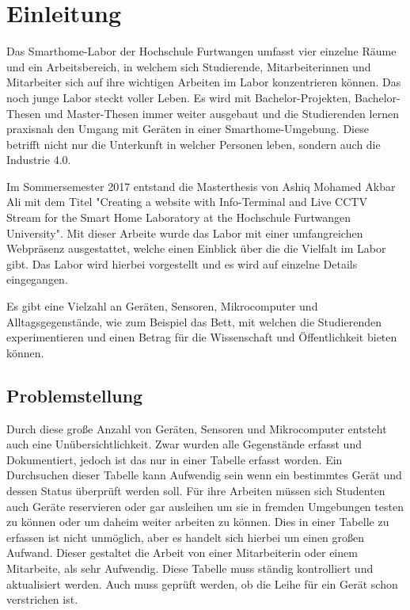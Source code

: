 \chapter{Einleitung}
Das Smarthome-Labor der Hochschule Furtwangen umfasst vier einzelne Räume und ein Arbeitsbereich, in welchem sich Studierende, Mitarbeiterinnen und Mitarbeiter sich auf ihre wichtigen Arbeiten im Labor konzentrieren können. Das noch junge Labor steckt voller Leben. Es wird mit Bachelor-Projekten, Bachelor-Thesen und Master-Thesen immer weiter ausgebaut und die Studierenden lernen praxisnah den Umgang mit Geräten in einer Smarthome-Umgebung. Diese betrifft nicht nur die Unterkunft in welcher Personen leben, sondern auch die Industrie 4.0.

Im Sommersemester 2017 entstand die Masterthesis von Ashiq Mohamed Akbar Ali mit dem Titel "Creating a website with Info-Terminal and Live CCTV Stream for the Smart Home Laboratory at the Hochschule Furtwangen University". Mit dieser Arbeite wurde das Labor mit einer umfangreichen Webpräsenz ausgestattet, welche einen Einblick über die die Vielfalt im Labor gibt. Das Labor wird hierbei vorgestellt und es wird auf einzelne Details eingegangen.

Es gibt eine Vielzahl an Geräten, Sensoren, Mikrocomputer und Alltagsgegenstände, wie zum Beispiel das Bett, mit welchen die Studierenden experimentieren und einen Betrag für die Wissenschaft und Öffentlichkeit bieten können.


\autocite{JustinEllingwood.2016b}

\section{Problemstellung}
\label{sec:Problemstellung}

Durch diese große Anzahl von Geräten, Sensoren und Mikrocomputer entsteht auch eine Unübersichtlichkeit. Zwar wurden alle Gegenstände erfasst und Dokumentiert, jedoch ist das nur in einer Tabelle erfasst worden. Ein Durchsuchen dieser Tabelle kann Aufwendig sein wenn ein bestimmtes Gerät und dessen Status überprüft werden soll. Für ihre Arbeiten müssen sich Studenten auch Geräte reservieren oder gar ausleihen um sie in fremden Umgebungen testen zu können oder um daheim weiter arbeiten zu können. Dies in einer Tabelle zu erfassen ist nicht unmöglich, aber es handelt sich hierbei um einen großen Aufwand. Dieser gestaltet die Arbeit von einer Mitarbeiterin oder einem Mitarbeite, als sehr Aufwendig. Diese Tabelle muss ständig kontrolliert und aktualisiert werden. Auch muss geprüft werden, ob die Leihe für ein Gerät schon verstrichen ist.


